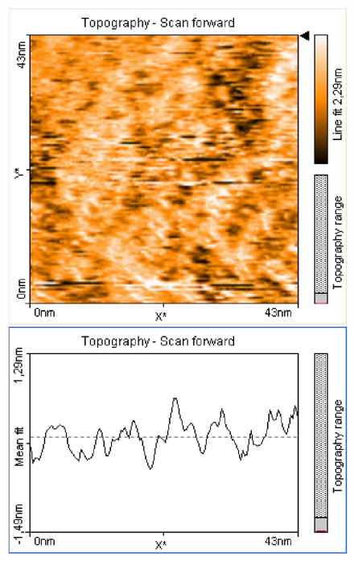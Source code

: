 \documentclass[12pt]{article}
\begin{document}
\begin{figure}[H]  
\begin{minipage}{0.4\linewidth}
\centering
\includegraphics[width=0.9\linewidth]{../plot/data/mos2/mos2.eps}
\end{minipage}
\begin{minipage}{0.2\linewidth}
\centering
\end{minipage}
\begin{minipage}{0.4\linewidth}
\centering

\end{minipage}
\end{figure}
\end{document}

